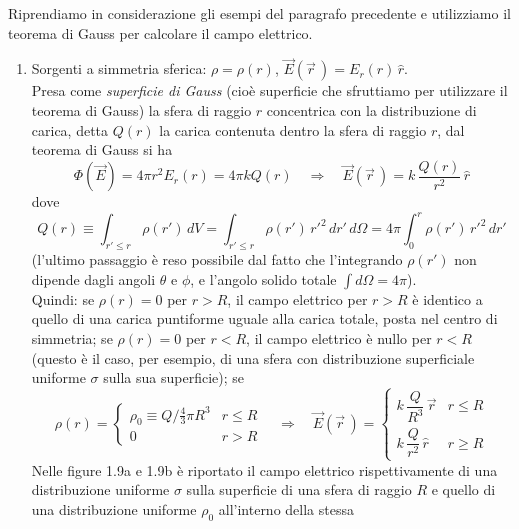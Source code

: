 Riprendiamo in considerazione gli esempi del paragrafo precedente e utilizziamo
il teorema di Gauss per calcolare il campo elettrico.
\begin{enumerate}
  \item Sorgenti a simmetria sferica: $\rho=\rho(r)$,
    $\vec E(\vec r\,)=E_r(r)\,\hat r$.\\
    Presa come \emph{superficie di Gauss} (cio\`e superficie che sfruttiamo per
    utilizzare il teorema di Gauss) la sfera di raggio $r$ concentrica con la
    distribuzione di carica, detta $Q(r)$ la carica contenuta dentro la sfera di
    raggio $r$, dal teorema di Gauss si ha
    \begin{equation}
      \Phi(\vec E)=4\pi r^2E_r(r)=4\pi kQ(r)
      \quad\Rightarrow\quad\vec E(\vec r\,)=k\,\frac{Q(r)}{r^2}\,\hat r
      \tag{1.47}
    \end{equation}
    dove
    \begin{equation}
      Q(r)\equiv\int_{r'\le r}\rho(r')\,dV
      =\int_{r'\le r}\rho(r')\,r'^2\,dr'\,d\Omega
      =4\pi\int_0^r\rho(r')\,r'^2\,dr'
      \tag{1.48}
    \end{equation}
    (l'ultimo passaggio \`e reso possibile dal fatto che l'integrando $\rho(r')$
    non dipende dagli angoli $\theta$ e $\phi$, e l'angolo solido totale
    $\int d\Omega=4\pi$).\\
    Quindi: se $\rho(r)=0$ per $r>R$, il campo elettrico per $r>R$ \`e identico
    a quello di una carica puntiforme uguale alla carica totale, posta nel
    centro di simmetria; se $\rho(r)=0$ per $r<R$, il campo elettrico \`e nullo
    per $r<R$ (questo \`e il caso, per esempio, di una sfera con distribuzione
    superficiale uniforme $\sigma$ sulla sua superficie); se
    \begin{equation}
      \rho(r)=\begin{cases}\rho_0\equiv Q/\frac43\pi R^3&r\le R\\[4pt]
      0&r>R\end{cases}
      \quad\Rightarrow\quad
      \vec E(\vec r\,)=\begin{cases}k\,\dfrac{Q}{R^3}\,\vec r&r\le R\\[8pt]
      k\,\dfrac{Q}{r^2}\,\hat r&r\ge R\end{cases}
      \tag{1.49}
    \end{equation}
    Nelle figure 1.9a e 1.9b \`e riportato il campo elettrico rispettivamente di
    una distribuzione uniforme $\sigma$ sulla superficie di una sfera di raggio
    $R$ e quello di una distribuzione uniforme $\rho_0$ all'interno della stessa

\end{enumerate}
